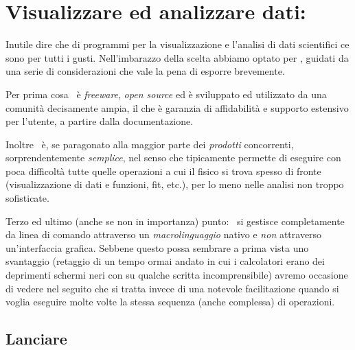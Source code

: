 \chapter{Visualizzare ed analizzare dati: \gnuplot}
\label{chap:gnuplot}
\mt


Inutile dire che di programmi per la visualizzazione e l'analisi
di dati scientifici ce sono per tutti i gusti. Nell'imbarazzo della scelta
abbiamo optato per \gnuplot, guidati da una serie di considerazioni che vale
la pena di esporre brevemente.

Per prima cosa \gnuplot\ \`e \emph{freeware}, \emph{open source} ed \`e
sviluppato ed utilizzato da una comunit\`a decisamente ampia, il che \`e
garanzia di affidabilit\`a e supporto estensivo per l'utente, a partire
dalla documentazione.

Inoltre \gnuplot\ \`e, se paragonato alla maggior parte dei \emph{prodotti}
concorrenti, sorprendentemente \emph{semplice}, nel senso che tipicamente
permette di eseguire con poca difficolt\`a tutte quelle operazioni a cui il
fisico si trova spesso di fronte (visualizzazione di dati e funzioni, fit,
etc.), per lo meno nelle analisi non troppo sofisticate.

Terzo ed ultimo (anche se non in importanza) punto: \gnuplot\ si gestisce
completamente da linea di comando attraverso un \emph{macrolinguaggio} nativo
e \emph{non} attraverso un'interfaccia grafica.
Sebbene questo possa sembrare a prima vista uno svantaggio (retaggio di un
tempo ormai andato in cui i calcolatori erano dei deprimenti schermi neri con
su qualche scritta incomprensibile) avremo occasione di vedere nel seguito
che si tratta invece di una notevole facilitazione quando si voglia
eseguire molte volte la stessa sequenza (anche complessa) di operazioni.


\section{Lanciare \gnuplot}

